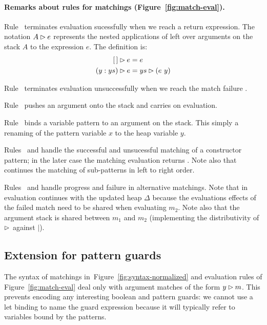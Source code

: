   \paragraph{Remarks about rules for matchings (Figure~\ref{fig:match-eval}).}

  Rule~ terminates evaluation sucessfully
  when we reach a return expression.
  The notation $A\rhd e$ represents the nested applications
  of  left over arguments on the stack $A$ to the expression $e$. The definition is:
  \begin{align*}
  [\,]\rhd e &= e \\
  (y:ys)\rhd e  &= ys\rhd (e~y)
  \end{align*}

  Rule~ terminates evaluation unsuccessfully when
  we reach the match failure \matchfail.

  Rule~ pushes an argument onto the stack and carries
  on evaluation.
  
  Rule~ binds a variable pattern to
  an argument on the stack. This simply a renaming of the pattern
  variable $x$ to the heap variable $y$.
  
  Rules~ and  handle the successful
  and unsucessful matching of a constructor pattern; in the later
  case the matching evaluation returns \matchfail.  Note also that
   continues the matching of sub-patterns in left to
  right order.
  

  Rules~ and  handle progress and failure
  in alternative matchings.
  Note that in  evaluation continues with the updated
  heap $\Delta$ because the evaluations effects of the failed match
  need to be shared when evaluating $m_2$.
  Note also that the argument stack is shared between $m_1$ and $m_2$
  (implementing the distributivity of $\rhd$ against $\mid$).
    
    
\subsection{Extension for pattern guards}\label{sec:pattern-guards}

The syntax of matchings in~Figure~\ref{fig:syntax-normalized} and
evaluation rules of Figure~\ref{fig:match-eval} deal only with
argument matches of the form $y\rhd m$.  This prevents
encoding any interesting boolean and pattern guards: we cannot use
a let binding to name the guard expression because it will
typically refer to variables bound by the patterns.

